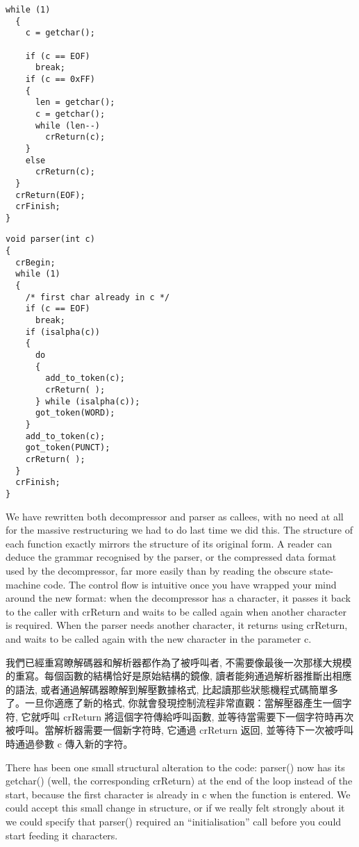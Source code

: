 \documentclass[12pt]{article}
\begin{document}
\begin{CJK}{UTF8}{bsmi}
\begin{multicols}{2}
\begin{lstlisting}[caption=decompressor, basicstyle=\footnotesize, breaklines=true]
  while (1) 
  {
    c = getchar();

    if (c == EOF)
      break;
    if (c == 0xFF) 
    {
      len = getchar();
      c = getchar();
      while (len--)
        crReturn(c);
    } 
    else
      crReturn(c);
  }
  crReturn(EOF);
  crFinish;
}
\end{lstlisting}


\begin{lstlisting}[caption=parser, basicstyle=\footnotesize, breaklines=true]
void parser(int c) 
{
  crBegin;
  while (1) 
  {
    /* first char already in c */
    if (c == EOF)
      break;
    if (isalpha(c)) 
    {
      do 
      {
        add_to_token(c);
        crReturn( );
      } while (isalpha(c));
      got_token(WORD);
    }
    add_to_token(c);
    got_token(PUNCT);
    crReturn( );
  }
  crFinish;
}
\end{lstlisting}
\end{multicols}

We have rewritten both decompressor and parser as callees, with no need at all for the massive restructuring we had to do last time we did this. The structure of each function exactly mirrors the structure of its original form. A reader can deduce the grammar recognised by the parser, or the compressed data format used by the decompressor, far more easily than by reading the obscure state-machine code. The control flow is intuitive once you have wrapped your mind around the new format: when the decompressor has a character, it passes it back to the caller with crReturn and waits to be called again when another character is required. When the parser needs another character, it returns using crReturn, and waits to be called again with the new character in the parameter c.

我們已經重寫瞭解碼器和解析器都作為了被呼叫者, 不需要像最後一次那樣大規模的重寫。每個函數的結構恰好是原始結構的鏡像, 讀者能夠通過解析器推斷出相應的語法, 或者通過解碼器瞭解到解壓數據格式, 比起讀那些狀態機程式碼簡單多了。一旦你適應了新的格式, 你就會發現控制流程非常直觀：當解壓器產生一個字符, 它就呼叫 crReturn 將這個字符傳給呼叫函數, 並等待當需要下一個字符時再次被呼叫。當解析器需要一個新字符時, 它通過
crReturn 返回, 並等待下一次被呼叫時通過參數 c 傳入新的字符。

There has been one small structural alteration to the code: parser() now has its getchar() (well, the corresponding crReturn) at the end of the loop instead of the start, because the first character is already in c when the function is entered. We could accept this small change in structure, or if we really felt strongly about it we could specify that parser() required an ``initialisation'' call before you could start feeding it characters.


\end{CJK}
\end{document}
